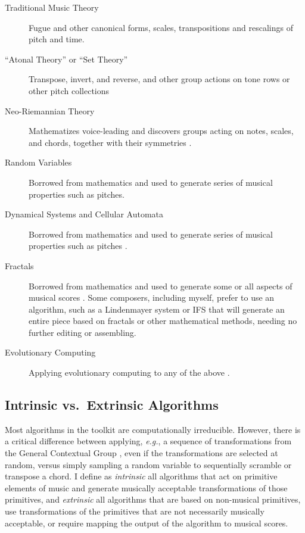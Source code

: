 \documentclass[]{interact}
\theoremstyle{plain}%
\theoremstyle{definition}
\theoremstyle{remark}
\begin{document}
\begin{description}
\item[Traditional Music Theory] Fugue and other canonical forms, scales, transpositions and rescalings of pitch and time.
\item[``Atonal Theory'' or ``Set Theory''] Transpose, invert, and reverse, and other group actions on tone rows or other pitch collections \citep{rahn1991basic}
\item[Neo-Riemannian Theory] Mathematizes voice-leading and discovers groups acting on notes, scales, and chords, together with their symmetries \citep{tymoczko2006geometry, tymoczko2011geometry, generalizedvoiceleadingspaces}.
\item[Random Variables] Borrowed from mathematics and used to generate series of musical properties such as pitches.
\item[Dynamical Systems and Cellular Automata] Borrowed from mathematics and used to generate series of musical properties such as pitches \citep{Miranda1993}.
\item[Fractals] Borrowed from mathematics and used to generate some or all aspects of musical scores \citep{miranda2001composing, madden2007fractals}. Some composers, including myself, prefer to use an algorithm, such as a Lindenmayer system \citep{algorithmicbeautyofplants, prusinkiewicz1986sgs,  fractalmusicwithstringrewritinggrammars} or IFS \citep{barnsley1993, ifsmusic} that will generate an entire piece based on fractals or other mathematical methods, needing no further editing or assembling. 
\item[Evolutionary Computing] Applying evolutionary computing to any of the above \citep{miranda2007evolutionary}.
\end{description}

\subsection{Intrinsic vs.\ Extrinsic Algorithms}

Most algorithms in the toolkit are computationally irreducible. However, there is a critical difference between applying, \emph{e.g.}, a sequence of transformations from the General Contextual Group \citep{fiore2005gcg}, even if the transformations are selected at random, versus simply sampling a random variable to sequentially scramble or transpose a chord. I define as \emph{intrinsic} all algorithms that act on primitive elements of music and generate musically acceptable transformations of those primitives, and \emph{extrinsic} all algorithms that are based on non-musical primitives, use transformations of the primitives that are not necessarily musically acceptable, or require mapping the output of the algorithm to musical scores.
\end{document}
